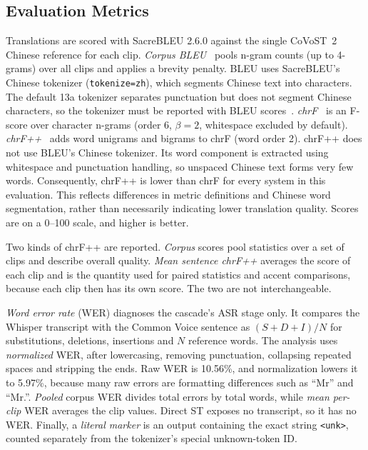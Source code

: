 \subsection{Evaluation Metrics}
\label{sec:metrics}

Translations are scored with SacreBLEU 2.6.0 against the single CoVoST~2 Chinese reference for each clip.
\emph{Corpus BLEU}~\cite{papineni2002bleu} pools n-gram counts (up to 4-grams) over all clips and applies a brevity penalty.
BLEU uses SacreBLEU's Chinese tokenizer (\texttt{tokenize=zh}), which segments Chinese text into characters.
The default 13a tokenizer separates punctuation but does not segment Chinese characters,
so the tokenizer must be reported with BLEU scores~\cite{post2018clarity}.
\emph{chrF}~\cite{popovic2015chrf} is an F-score over character n-grams (order 6, $\beta=2$, whitespace excluded by default).
\emph{chrF++}~\cite{popovic2017chrfpp} adds word unigrams and bigrams to chrF (word order 2).
chrF++ does not use BLEU's Chinese tokenizer. Its word component is extracted using whitespace
and punctuation handling, so unspaced Chinese text forms very few words. Consequently, chrF++ is
lower than chrF for every system in this evaluation. This reflects differences in metric definitions
and Chinese word segmentation, rather than necessarily indicating lower translation quality.
Scores are on a 0--100 scale, and higher is better.

Two kinds of chrF++ are reported. \emph{Corpus} scores pool statistics over
a set of clips and describe overall quality. \emph{Mean sentence chrF++}
averages the score of each clip and is the quantity used for paired
statistics and accent comparisons, because each clip then has its own
score. The two are not interchangeable.

\emph{Word error rate} (WER) diagnoses the cascade's ASR stage only. It
compares the Whisper transcript with the Common Voice sentence as
$(S+D+I)/N$ for substitutions, deletions, insertions and $N$ reference
words. The analysis uses \emph{normalized} WER, after lowercasing, removing
punctuation, collapsing repeated spaces and stripping the ends. Raw WER is
10.56\%, and normalization lowers it to 5.97\%, because many raw errors
are formatting differences such as ``Mr'' and ``Mr.''. \emph{Pooled}
corpus WER divides total errors by total words, while \emph{mean per-clip}
WER averages the clip values. Direct ST exposes no transcript, so it has
no WER. Finally, a \emph{literal marker} is an output containing the exact
string \texttt{<unk>}, counted separately from the tokenizer's special
unknown-token ID.

